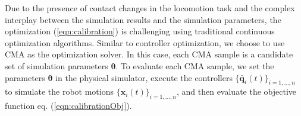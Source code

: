 Due to the presence of contact changes in the locomotion task and the complex interplay between the simulation results and the simulation parameters, the optimization (\ref{eqn:calibration}) is challenging using traditional continuous optimization algorithms. Similar to controller optimization, we choose to use CMA as the optimization solver. In this case, each CMA sample is a candidate set of simulation parameters $\mathbf{\theta}$. To evaluate each CMA sample, we set the parameters $\mathbf{\theta}$ in the physical simulator, execute the controllers $\{\bar{\mathbf{q}}_i(t)\}_{i=1,...,n}$ to simulate the robot motions $\{\mathbf{x}_i(t)\}_{i=1,...,n}$, and then evaluate the objective function eq. (\ref{eqn:calibrationObj}).

